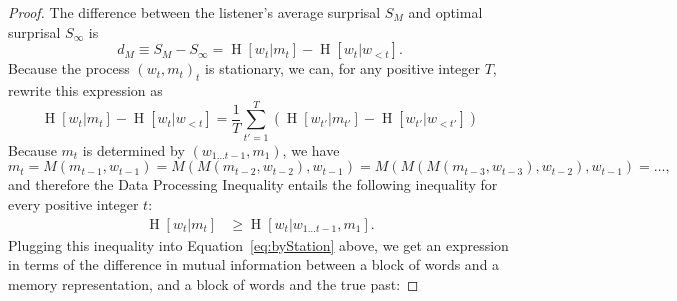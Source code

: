 \documentclass[11pt,letterpaper]{article}
\newcommand\mhahn[1]{{\color{red}(#1)}}
\newcounter{theorem}
\newtheorem{lemma}[theorem]{Lemma}
\begin{document}
\begin{proof}


The difference between the listener's average surprisal $S_M$ and optimal surprisal $S_\infty$ is 
	\begin{equation}
	\label{eq:surprisal-divergence}
		d_M \equiv S_M - S_\infty = \operatorname{H}[w_t | m_t] - \operatorname{H}[w_t | w_{<t}].
	\end{equation}
	Because the process $(w_t, m_t)_t$ is stationary, we can, for any positive integer $T$, rewrite this expression as
\begin{equation}\label{eq:byStation}
\operatorname{H}[w_t | m_t] - \operatorname{H}[w_t | w_{<t}] =  \frac{1}{T} \sum_{t'=1}^{T} \left(\operatorname{H}[w_{t'} | m_{t'}] - \operatorname{H}[w_{t'} | w_{<t'}]\right) 
\end{equation}
%
%
%
Because $m_t$ is determined by $(w_{1 \dots t-1}, m_1)$, we have
\begin{equation}
	m_t = M(m_{t-1}, w_{t-1}) = M(M(m_{t-2}, w_{t-2}), w_{t-1}) = M(M(M(m_{t-3}, w_{t-3}), w_{t-2}), w_{t-1}) = \dots,
\end{equation}
and therefore the Data Processing Inequality \citep{cover2006elements} entails the following inequality for every positive integer $t$:
\begin{align}\label{eq:plugged}
\operatorname{H}[w_t | m_t]& \geq \operatorname{H}[w_t|w_{1\dots t-1}, m_1]. 
\end{align}
Plugging this inequality into Equation~\ref{eq:byStation} above, we get an expression in terms of the difference in mutual information between a block of words and a memory representation, and a block of words and the true past:

\end{proof}
\end{document}
